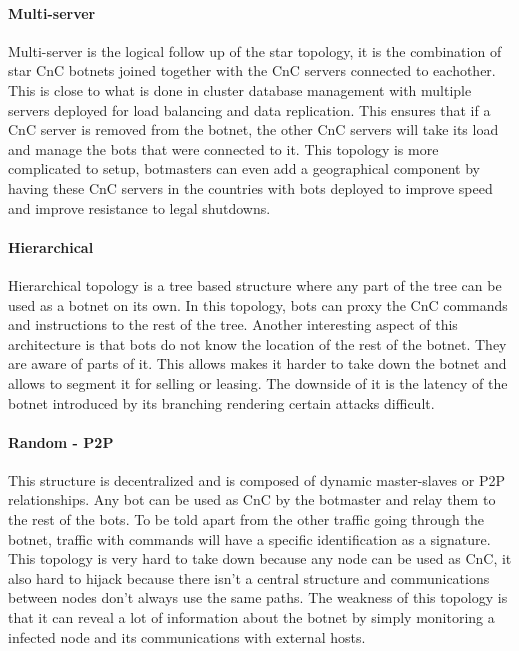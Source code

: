 \paragraph{Multi-server}
Multi-server is the logical follow up of the star topology, it is the combination of star CnC botnets joined together with the CnC servers connected to eachother. This is close to what is done in cluster database management with multiple servers deployed for load balancing and data replication. This ensures that if a CnC server is removed from the botnet, the other CnC servers will take its load and manage the bots that were connected to it. This topology is more complicated to setup, botmasters can even add a geographical component by having these CnC servers in the countries with bots deployed to improve speed and improve resistance to legal shutdowns.

\paragraph{Hierarchical}
Hierarchical topology is a tree based structure where any part of the tree can be used as a botnet on its own. In this topology, bots can proxy the CnC commands and instructions to the rest of the tree. Another interesting aspect of this architecture is that bots do not know the location of the rest of the botnet. They are aware of parts of it. This allows makes it harder to take down the botnet and allows to segment it for selling or leasing. The downside of it is the latency of the botnet introduced by its branching rendering certain attacks difficult.

\paragraph{Random - P2P}
This structure is decentralized and is composed of dynamic master-slaves or P2P relationships. Any bot can be used as CnC by the botmaster and relay them to the rest of the bots. To be told apart from the other traffic going through the botnet, traffic with commands will have a specific identification as a signature. This topology is very hard to take down because any node can be used as CnC, it also hard to hijack because there isn't a central structure and communications between nodes don't always use the same paths. The weakness of this topology is that it can reveal a lot of information about the botnet by simply monitoring a infected node and its communications with external hosts.

